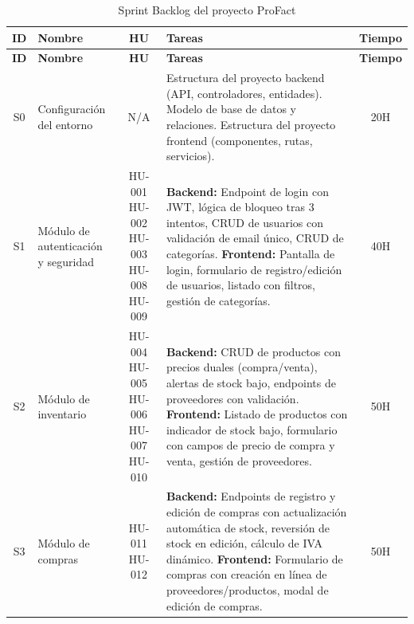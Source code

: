 \documentclass[12pt, letterpaper]{report}
\begin{document}
\begin{longtable}{|c|p{3cm}|c|p{6cm}|c|}
\caption{Sprint Backlog del proyecto ProFact} \label{tab:sb} \\
\hline
\textbf{ID} & \textbf{Nombre} & \textbf{HU} & \textbf{Tareas} & \textbf{Tiempo} \\ \hline
\endfirsthead
\hline
\textbf{ID} & \textbf{Nombre} & \textbf{HU} & \textbf{Tareas} & \textbf{Tiempo} \\ \hline
\endhead
S0 & Configuración del entorno & N/A & Estructura del proyecto backend (API, controladores, entidades). \newline Modelo de base de datos y relaciones. \newline Estructura del proyecto frontend (componentes, rutas, servicios). & 20H \\ \hline
S1 & Módulo de autenticación y seguridad & HU-001 \newline HU-002 \newline HU-003 \newline HU-008 \newline HU-009 & \textbf{Backend:} Endpoint de login con JWT, lógica de bloqueo tras 3 intentos, CRUD de usuarios con validación de email único, CRUD de categorías. \newline \textbf{Frontend:} Pantalla de login, formulario de registro/edición de usuarios, listado con filtros, gestión de categorías. & 40H \\ \hline
S2 & Módulo de inventario & HU-004 \newline HU-005 \newline HU-006 \newline HU-007 \newline HU-010 & \textbf{Backend:} CRUD de productos con precios duales (compra/venta), alertas de stock bajo, endpoints de proveedores con validación. \newline \textbf{Frontend:} Listado de productos con indicador de stock bajo, formulario con campos de precio de compra y venta, gestión de proveedores. & 50H \\ \hline
S3 & Módulo de compras & HU-011 \newline HU-012 & \textbf{Backend:} Endpoints de registro y edición de compras con actualización automática de stock, reversión de stock en edición, cálculo de IVA dinámico. \newline \textbf{Frontend:} Formulario de compras con creación en línea de proveedores/productos, modal de edición de compras. & 50H \\ \hline

\end{longtable}
\end{document}
